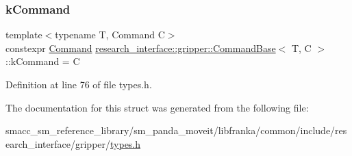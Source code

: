 \subsubsection{\texorpdfstring{k\+Command}{kCommand}}
{\footnotesize\ttfamily template$<$typename T, Command C$>$ \\
constexpr \hyperlink{namespaceresearch__interface_1_1gripper_adeda0327764e059bac8a5f967ce41590}{Command} \hyperlink{structresearch__interface_1_1gripper_1_1CommandBase}{research\+\_\+interface\+::gripper\+::\+Command\+Base}$<$ T, C $>$\+::k\+Command = C\hspace{0.3cm}{\ttfamily [static]}}



Definition at line 76 of file types.\+h.



The documentation for this struct was generated from the following file\+:\begin{DoxyCompactItemize}
\item 
smacc\+\_\+sm\+\_\+reference\+\_\+library/sm\+\_\+panda\+\_\+moveit/libfranka/common/include/research\+\_\+interface/gripper/\hyperlink{types_8h}{types.\+h}\end{DoxyCompactItemize}
